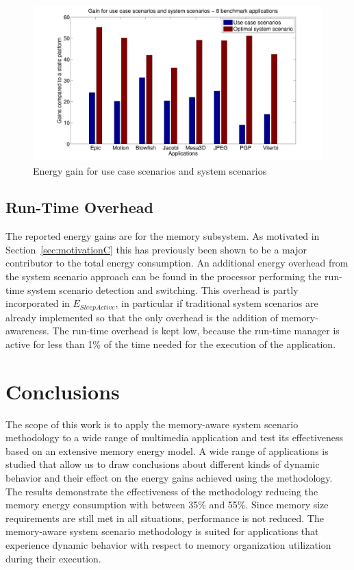 \begin{figure}
\centering
\includegraphics[width=\textwidth]{C/usecase.pdf}
\caption{Energy gain for use case scenarios and system scenarios}
\label{fig:usecaseC}
\end{figure}

\subsection{Run-Time Overhead}  

The reported energy gains are for the memory subsystem. 
As motivated in Section~\ref{sec:motivationC} this has previously been shown to be a major contributor to the total energy consumption. 
An additional energy overhead from the system scenario approach can be found in the processor performing the run-time system scenario detection and switching. 
This overhead is partly incorporated in $E_{SleepActive}$, in particular if traditional system scenarios are already implemented so that the only overhead is the addition of memory-awareness.
The run-time overhead is kept low, because the run-time manager is active for less than 1\% of the time needed for the execution of the application. 

\section{Conclusions}
\label{sec:conclusionC}

The scope of this work is to apply the memory-aware system scenario methodology to a wide range of multimedia application and test its effectiveness based on an extensive memory energy model. 
A wide range of applications is studied that allow us to draw conclusions about different kinds of dynamic behavior and their effect on the energy gains achieved using the methodology. 
The results demonstrate the effectiveness of the methodology reducing the memory energy consumption with between 35\% and 55\%. 
Since memory size requirements are still met in all situations, performance is not reduced. 
The memory-aware system scenario methodology is suited for applications that experience dynamic behavior with respect to memory organization utilization during their execution.

%
%